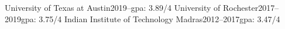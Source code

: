     {University of Texas at Austin}{2019--}{\rmsc gpa: 3.89/4}{}
    {University of Rochester}{2017--2019}{\rmsc gpa: 3.75/4}{}
    {Indian Institute of Technology Madras}{2012--2017}{\rmsc gpa: 3.47/4}{}